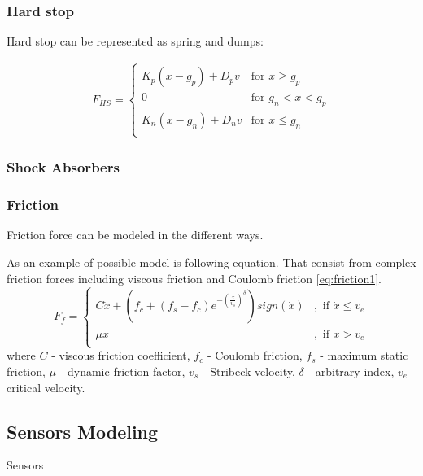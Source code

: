 \documentclass[class=article, crop=false]{standalone}
\begin{document}
\subsubsection{Hard stop}
Hard stop can be represented as spring and dumps:

\begin{align}
    F_{HS} =
    \begin{cases}
        K_p(x-g_p) + D_pv & \text{for } x \ge g_p \\
        0 & \text{for } g_n < x < g_p \\
        K_n(x-g_n) + D_nv & \text{for } x \le g_n \\
    \end{cases}
\end{align}


\subsubsection{Shock Absorbers}
\subsubsection{Friction}
Friction force can be modeled in the
different ways.

As an example of possible model is following equation. That consist from
complex friction forces including viscous friction and Coulomb friction
\ref{eq:friction1}.
\begin{equation}
    F_f = 
    \begin{cases}
        C \dot{x} + \left(f_c + (f_s-f_c)
        e^{-\left(\frac{\dot{x}}{v_s}\right)^{\delta}}\right) sign(\dot{x}) &,
        \text{ if } \dot{x} \le v_e \\
        \mu \dot{x} &,
        \text{ if } \dot{x} > v_e \\
    \end{cases}
    \label{eq:friction1}
\end{equation}
where $C$ - viscous friction coefficient, $f_c$ - Coulomb friction, $f_s$ -
maximum static friction, $\mu$ - dynamic friction factor, $v_s$ - Stribeck velocity,
$\delta$ - arbitrary index, $v_e$ critical velocity.


\subsection{Sensors Modeling}
Sensors
\end{document}
